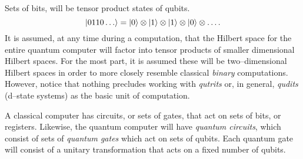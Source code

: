 Sets of bits, will be tensor product states of qubits.  
\begin{equation}
{|{0110\ldots}\rangle} = {|{0}\rangle}\otimes
             {|{1}\rangle}\otimes
             {|{1}\rangle}\otimes
             {|{0}\rangle}\otimes\ldots.
\end{equation}
It is assumed, at any time during a computation, that the Hilbert space
for the entire quantum computer will factor
into tensor products of smaller dimensional Hilbert spaces.  
For the most part, it is assumed these will be two--dimensional Hilbert 
spaces in order to more closely resemble classical {\sl binary} computations.  
However, notice that nothing precludes
working with {\sl qutrits} or, in general, {\sl qudits} (d--state
systems) as the basic unit of computation.

A classical computer has circuits, or sets of gates, that act on 
sets of bits, or registers.
Likewise, the quantum computer will have \emph{quantum circuits},
 which consist of sets of \emph{quantum gates}
 which act on sets of qubits.  Each quantum
gate will consist of a unitary transformation that acts on a fixed
number of qubits.  

